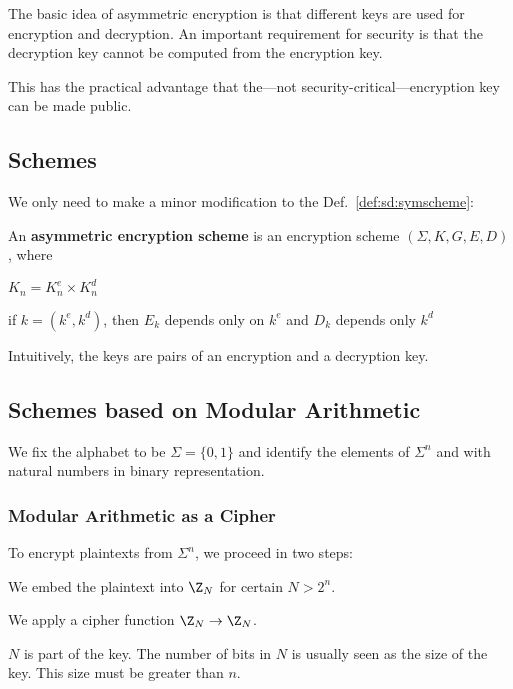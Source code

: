 The basic idea of asymmetric encryption is that different keys are used for encryption and decryption.
An important requirement for security is that the decryption key cannot be computed from the encryption key.

This has the practical advantage that the---not security-critical---encryption key can be made public.

\subsection{Schemes}

We only need to make a minor modification to the Def.~\ref{def:sd:symscheme}:

\begin{definition}\label{def:sd:asymscheme}
 An \textbf{asymmetric encryption scheme} is an encryption scheme $(\Sigma,K, G, E, D)$, where
  \begin{compactitem}
   \item $K_n=K^e_n\times K^d_n$
   \item if $k=(k^e,k^d)$, then $E_k$ depends only on $k^e$ and $D_k$ depends only $k^d$
  \end{compactitem}
\end{definition}
Intuitively, the keys are pairs of an encryption and a decryption key.

\subsection{Schemes based on Modular Arithmetic}

We fix the alphabet to be $\Sigma=\{0,1\}$ and identify the elements of $\Sigma^n$ and with natural numbers in binary representation.

\subsubsection{Modular Arithmetic as a Cipher}

To encrypt plaintexts from $\Sigma^n$, we proceed in two steps:
\begin{compactenum}
 \item We embed the plaintext into $\Z_N$ for certain $N>2^n$.
 \item We apply a cipher function $\Z_N\to\Z_N$.
\end{compactenum}

$N$ is part of the key.
The number of bits in $N$ is usually seen as the size of the key.
This size must be greater than $n$.

